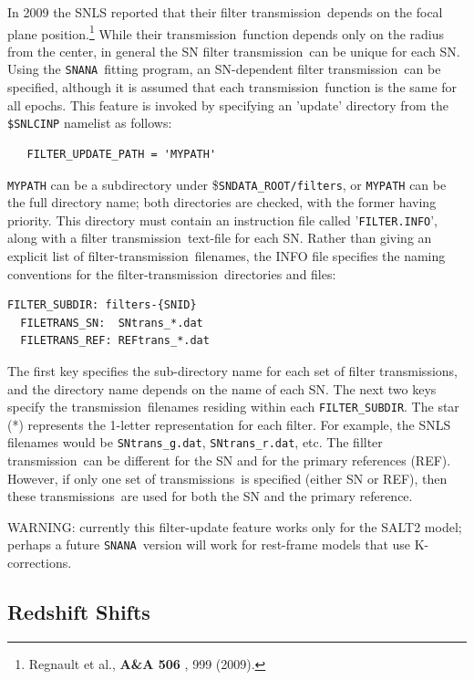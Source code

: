 \documentclass[12pt]{article}
\newcommand{\snana}{{\tt SNANA}}
\newcommand{\sndataroot}{{\tt SNDATA\_ROOT}}
\newcommand{\trans}{transmission}
\newcommand{\transs}{transmissions}
\begin{document}
In 2009 the SNLS reported that their filter \trans\ depends
on the focal plane position.\footnote{Regnault et al., 
      {\bf A\&A 506} , 999 (2009).}
While their \trans\ function depends only on the radius 
from the center, in general the SN filter \trans\ can be 
unique for each SN.
Using the \snana\ fitting program, an SN-dependent filter \trans\
can be specified, although it is assumed that each \trans\ function
is the same for all epochs. This feature is invoked by specifying an
'update' directory from the {\tt \$SNLCINP} namelist as follows:
%
\begin{verbatim}
   FILTER_UPDATE_PATH = 'MYPATH'
\end{verbatim}
%
{\tt MYPATH} can be a subdirectory under
{\$\sndataroot}{\tt /filters}, 
or {\tt MYPATH} can be the full directory name;
both directories are checked, with the former having priority.
This directory must contain an instruction file called
'{\tt FILTER.INFO}', along with a filter \trans\ text-file
for each SN.
Rather than giving an explicit list of filter-\trans\
filenames, the INFO file specifies the naming conventions 
for the filter-\trans\ directories and files:
%
\begin{Verbatim}[frame=single]
  FILTER_SUBDIR: filters-{SNID}
  FILETRANS_SN:  SNtrans_*.dat
  FILETRANS_REF: REFtrans_*.dat
\end{Verbatim}
% 
The first key specifies the sub-directory name for each 
set of filter \transs, and the directory name depends on
the name of each SN. The next two keys specify the
\trans\ filenames residing within each {\tt FILTER\_SUBDIR}.
The star (*) represents the 1-letter representation for each filter. 
For example, the SNLS filenames would be 
{\tt SNtrans\_g.dat}, {\tt SNtrans\_r.dat}, etc.
The fillter \trans\ can be different for the SN
and for the primary references (REF). However, if only
one set of \transs\ is specified (either SN or REF),
then these \transs\ are used for both the SN and the
primary reference.


\bigskip
WARNING: currently this filter-update feature works 
only for the SALT2 model;
perhaps a future \snana\ version will work for 
rest-frame models that use K-corrections.


   \subsection{Redshift Shifts}
   \label{subsec:zshift}
\end{document}
